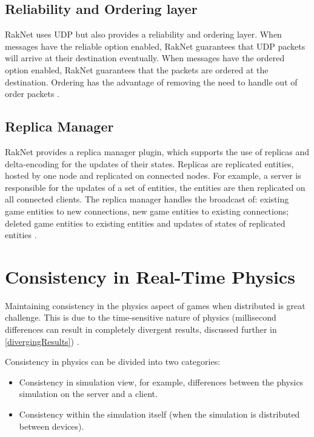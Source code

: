 \subsection{Reliability and Ordering layer}
RakNet uses UDP but also provides a reliability and ordering layer. When messages have the reliable option enabled, RakNet guarantees that UDP packets will arrive at their destination eventually. When messages have the ordered option enabled, RakNet guarantees that the packets are ordered at the destination. Ordering has the advantage of removing the need to handle out of order packets \cite{RakNetReliability}.

\subsection{Replica Manager}
RakNet provides a replica manager plugin, which supports the use of replicas and delta-encoding for the updates of their states. Replicas are replicated entities, hosted by one node and replicated on connected nodes. For example, a server is responsible for the updates of a set of entities, the entities are then replicated on all connected clients. The replica manager handles the broadcast of: existing game entities to new connections, new game entities to existing connections; deleted game entities to existing entities and updates of states of replicated entities \cite{RakNetReplica}.

\section{Consistency in Real-Time Physics} \label{ConsistencyRealTimePhysics}


Maintaining consistency in the physics aspect of games when distributed is great challenge. This is due to the time-sensitive nature of physics (millisecond differences can result in completely divergent results, discussed further in \ref{divergingResults}) \cite{2012EnhancedDeadReckoning}.

Consistency in physics can be divided into two categories:
\begin{itemize}
\item Consistency in simulation view, for example, differences between the physics simulation on the server and a client.
\item Consistency within the simulation itself (when the simulation is distributed between devices).
\end{itemize}

